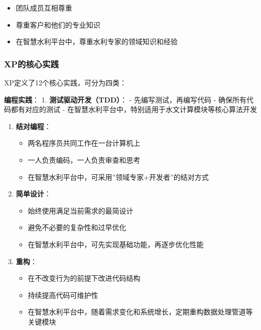 \begin{enumerate}
  \begin{itemize}
  \tightlist
  \item
    团队成员互相尊重
  \item
    尊重客户和他们的专业知识
  \item
    在智慧水利平台中，尊重水利专家的领域知识和经验
  \end{itemize}
\end{enumerate}

\subsubsection{XP的核心实践}\label{xpux7684ux6838ux5fc3ux5b9eux8df5}

XP定义了12个核心实践，可分为四类：

\textbf{编程实践}： 1. \textbf{测试驱动开发（TDD）}： -
先编写测试，再编写代码 - 确保所有代码都有对应的测试 -
在智慧水利平台中，特别适用于水文计算模块等核心算法开发

\begin{enumerate}
\def\labelenumi{\arabic{enumi}.}
\setcounter{enumi}{1}
\tightlist
\item
  \textbf{结对编程}：

  \begin{itemize}
  \tightlist
  \item
    两名程序员共同工作在一台计算机上
  \item
    一人负责编码，一人负责审查和思考
  \item
    在智慧水利平台中，可采用''领域专家+开发者''的结对方式
  \end{itemize}
\item
  \textbf{简单设计}：

  \begin{itemize}
  \tightlist
  \item
    始终使用满足当前需求的最简设计
  \item
    避免不必要的复杂性和过早优化
  \item
    在智慧水利平台中，可先实现基础功能，再逐步优化性能
  \end{itemize}
\item
  \textbf{重构}：

  \begin{itemize}
  \tightlist
  \item
    在不改变行为的前提下改进代码结构
  \item
    持续提高代码可维护性
  \item
    在智慧水利平台中，随着需求变化和系统增长，定期重构数据处理管道等关键模块
  \end{itemize}
\end{enumerate}


